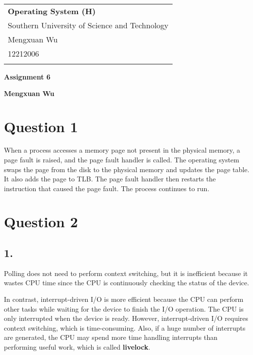 \documentclass[a4paper,12pt]{article}
\begin{document}
\thispagestyle{empty} %

\begin{tabular}{p{15.5cm}}
{\large \bf Operating System (H)} \\
Southern University of Science and Technology \\ Mengxuan Wu \\ 12212006 \\
\hline
\\
\end{tabular}

\vspace*{0.3cm} %

\begin{center}
	{\Large \bf Assignment 6}
	\vspace{2mm}

	{\bf Mengxuan Wu}
		
\end{center}  

\vspace{0.4cm}

\section*{Question 1}

When a process accesses a memory page not present in the physical memory, a page fault is raised, and the page fault handler is called. The operating system swaps the page from the disk to the physical memory and updates the page table. It also adds the page to TLB. The page fault handler then restarts the instruction that caused the page fault. The process continues to run.

\section*{Question 2}

\subsection*{1.}

Polling does not need to perform context switching, but it is inefficient because it wastes CPU time since the CPU is continuously checking the status of the device. 

In contrast, interrupt-driven I/O is more efficient because the CPU can perform other tasks while waiting for the device to finish the I/O operation. The CPU is only interrupted when the device is ready. However, interrupt-driven I/O requires context switching, which is time-consuming. Also, if a huge number of interrupts are generated, the CPU may spend more time handling interrupts than performing useful work, which is called \textbf{livelock}.
\end{document}
